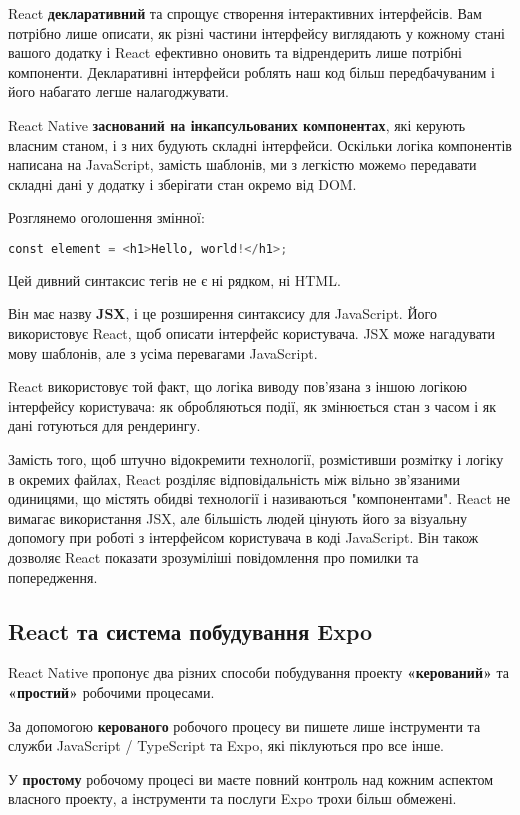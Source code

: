 React \textbf{декларативний} та спрощує створення інтерактивних інтерфейсів.
Вам потрібно лише описати, як різні частини інтерфейсу виглядають у кожному стані вашого додатку і React ефективно оновить та відрендерить лише потрібні компоненти.
Декларативні інтерфейси роблять наш код більш передбачуваним і його набагато легше налагоджувати.

React Native \textbf{заснований на інкапсульованих компонентах}, які керують власним станом, і з них будують складні інтерфейси.
Оскільки логіка компонентів написана на JavaScript, замість шаблонів, ми з легкістю можемo передавати складні дані у додатку і зберігати стан окремо від DOM.

Розглянемо оголошення змінної:
\begin{lstlisting}[style=light, language=Python,label={lst:jsx_hello},caption=JSX Hello World]
const element = <h1>Hello, world!</h1>;
\end{lstlisting}

Цей дивний синтаксис тегів не є ні рядком, ні HTML.

Він має назву \textbf{JSX}, і це розширення синтаксису для JavaScript.
Його використовує React, щоб описати інтерфейс користувача.
JSX може нагадувати мову шаблонів, але з усіма перевагами JavaScript.

React використовує той факт, що логіка виводу пов’язана з іншою логікою інтерфейсу користувача: як обробляються події, як змінюється стан з часом і як дані готуються для рендерингу.

Замість того, щоб штучно відокремити технології, розмістивши розмітку і логіку в окремих файлах, React розділяє відповідальність між вільно зв’язаними одиницями, що містять обидві технології і називаються "компонентами".
React не вимагає використання JSX, але більшість людей цінують його за візуальну допомогу при роботі з інтерфейсом користувача в коді JavaScript.
Він також дозволяє React показати зрозуміліші повідомлення про помилки та попередження.

\subsection{React та система побудування Expo}
\label{subsec:rn_expo}
React Native пропонує два різних способи побудування проекту \textbf{«керований»} та \textbf{«простий»} робочими процесами.
\begin{itemize}
    \begin{item}
        За допомогою \textbf{керованого} робочого процесу ви пишете лише інструменти та служби JavaScript / TypeScript та Expo, які піклуються про все інше.
    \end{item}
    \begin{item}
        У \textbf{простому} робочому процесі ви маєте повний контроль над кожним аспектом власного проекту, а інструменти та послуги Expo трохи більш обмежені.
    \end{item}
\end{itemize}

